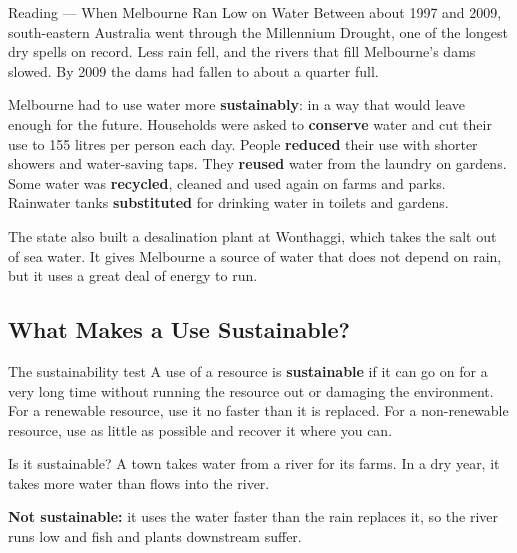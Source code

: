 \begin{readingbox}{Reading --- When Melbourne Ran Low on Water}
Between about 1997 and 2009, south-eastern Australia went through the Millennium Drought, one of the longest dry spells on record. Less rain fell, and the rivers that fill Melbourne's dams slowed. By 2009 the dams had fallen to about a quarter full.

Melbourne had to use water more \textbf{sustainably}: in a way that would leave enough for the future. Households were asked to \textbf{conserve} water and cut their use to 155 litres per person each day. People \textbf{reduced} their use with shorter showers and water-saving taps. They \textbf{reused} water from the laundry on gardens. Some water was \textbf{recycled}, cleaned and used again on farms and parks. Rainwater tanks \textbf{substituted} for drinking water in toilets and gardens.

The state also built a desalination plant at Wonthaggi, which takes the salt out of sea water. It gives Melbourne a source of water that does not depend on rain, but it uses a great deal of energy to run.
\end{readingbox}

\rcreset
{}

\label{theory:4}

\subsection{What Makes a Use Sustainable?}\label{sub:4.1}

\begin{skillbox}{The sustainability test}
A use of a resource is \textbf{sustainable} if it can go on for a very long time without running the resource out or damaging the environment. For a renewable resource, use it no faster than it is replaced. For a non-renewable resource, use as little as possible and recover it where you can.
\end{skillbox}

\begin{workedex}{Is it sustainable?}
A town takes water from a river for its farms. In a dry year, it takes more water than flows into the river.

\smallskip
\textbf{Not sustainable:} it uses the water faster than the rain replaces it, so the river runs low and fish and plants downstream suffer.
\end{workedex}

